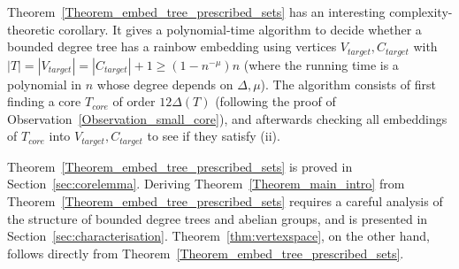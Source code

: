 \documentclass[a4paper,11pt,hidelinks]{amsart}
\theoremstyle{definition}
\begin{document}
Theorem~\ref{Theorem_embed_tree_prescribed_sets} has an interesting complexity-theoretic corollary. It gives a polynomial-time algorithm to decide whether a bounded degree tree has a rainbow embedding using vertices $V_{target}, C_{target}$ with $|T|=|V_{target}|=|C_{target}|+1\geq (1-n^{-\mu})n$ (where the running time is a polynomial in $n$ whose degree depends on $\Delta, \mu$). The algorithm consists of first finding a core $T_{core}$ of order $12\Delta(T)$ (following the proof of Observation~\ref{Observation_small_core}), and afterwards checking all embeddings of $T_{core}$ into $V_{target}, C_{target}$ to see if they satisfy (ii).

Theorem~\ref{Theorem_embed_tree_prescribed_sets} is proved in Section~\ref{sec:corelemma}. Deriving Theorem~\ref{Theorem_main_intro} from Theorem~\ref{Theorem_embed_tree_prescribed_sets} requires a careful analysis of the structure of bounded degree trees and abelian groups, and is presented in Section~\ref{sec:characterisation}. Theorem~\ref{thm:vertexspace}, on the other hand, follows directly from Theorem~\ref{Theorem_embed_tree_prescribed_sets}.
\end{document}
